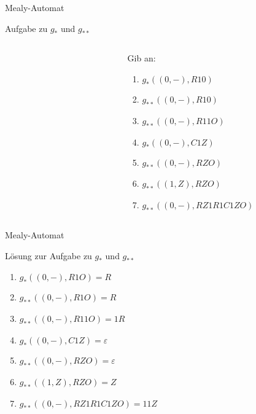 \begin{frame}[fragile]{Mealy-Automat}
\begin{exampleblock}{Aufgabe zu $g_{\ast}$ und $g_{\ast\ast}$}
\begin{columns}
\begin{column}{0.6\textwidth}
\begin{figure}[ht]
\end{figure}
			\end{column}
			\begin{column}{0.4\textwidth}
			\small
				Gib an:
				\begin{enumerate}
					\item $g_{\ast}((0,-), R10)$
					\item $g_{\ast\ast}((0,-), R10)$
					\item $g_{\ast\ast}((0,-), R11O)$
					\item $g_{\ast}((0,-), C1Z)$
					\item $g_{\ast\ast}((0,-), RZO)$
					\item $g_{\ast\ast}((1,Z), RZO)$
					\item $g_{\ast\ast}((0,-), RZ1R1C1ZO)$
				\end{enumerate}
			\end{column}
		\end{columns}
	\end{exampleblock}
\end{frame}

\begin{frame}{Mealy-Automat}
	\begin{block}{Lösung zur Aufgabe zu $g_{\ast}$ und $g_{\ast\ast}$}
		\begin{enumerate}
					\item $g_{\ast}((0,-), R1O) = R$
					\item $g_{\ast\ast}((0,-), R1O) = R$
					\item $g_{\ast\ast}((0,-), R11O) = 1R$
					\item $g_{\ast}((0,-), C1Z) = \varepsilon$
					\item $g_{\ast\ast}((0,-), RZO) = \varepsilon$
					\item $g_{\ast\ast}((1,Z), RZO) = Z $
					\item $g_{\ast\ast}((0,-), RZ1R1C1ZO)= 11Z$
				\end{enumerate}
	\end{block}
\end{frame}



